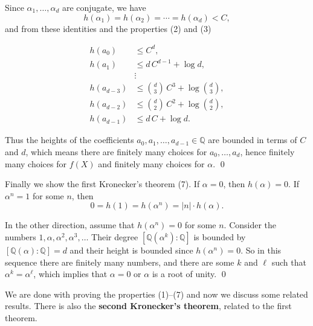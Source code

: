 \documentclass{article}
\newcommand{\term}{\textbf}
\newcommand{\QQ}{\mathbb{Q}}
\theoremstyle{myplain}
\theoremstyle{mydefinition}
\begin{document}
Since $\alpha_1,\ldots,\alpha_d$ are conjugate, we have
$$h (\alpha_1) = h (\alpha_2) = \cdots = h (\alpha_d) < C,$$
and from these identities and the properties (2) and (3)

\begin{align*}
  h (a_0) & \le C^d,\\
  h (a_1) & \le d\,C^{d-1} + \log d, \\
          & \vdots \\
  h (a_{d-3}) & \le {d \choose 3} \, C^3 + \log {d \choose 3}, \\
  h (a_{d-2}) & \le {d \choose 2} \, C^2 + \log {d \choose 2}, \\
  h (a_{d-1}) & \le d\,C + \log d.
\end{align*}

Thus the heights of the coefficients $a_0, a_1, \ldots, a_{d-1} \in \QQ$ are
bounded in terms of $C$ and $d$, which means there are finitely many choices for
$a_0, \ldots, a_d$, hence finitely many choices for $f (X)$ and finitely many
choices for $\alpha$. \qed

\vspace{1em}

Finally we show the first Kronecker's theorem (7). If $\alpha = 0$, then
$h (\alpha) = 0$. If $\alpha^n = 1$ for some $n$, then
\[ 0 = h (1) = h (\alpha^n) = |n|\cdot h (\alpha). \]

In the other direction, assume that $h (\alpha^n) = 0$ for some $n$. Consider
the numbers $1, \alpha, \alpha^2, \alpha^3, \ldots$ Their degree
$[\QQ (\alpha^k) : \QQ]$ is bounded by $[\QQ (\alpha) : \QQ] = d$ and their
height is bounded since $h (\alpha^n) = 0$. So in this sequence there are
finitely many numbers, and there are some $k$ and $\ell$ such that
$\alpha^k = \alpha^\ell$, which implies that $\alpha = 0$ or $\alpha$ is a root
of unity. \qed

\vspace{1em}

We are done with proving the properties (1)--(7) and now we discuss some related
results. There is also the \term{second Kronecker's theorem}, related to the
first theorem.
\end{document}

